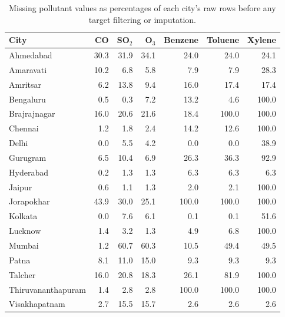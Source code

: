 \begin{table}[!htbp]
\centering
\caption{Missing pollutant values as percentages of each city's raw rows before any target filtering or imputation.}\label{tab:missing1}
\setlength{\tabcolsep}{4pt}
\begin{tabular}{lrrrrrr}
\toprule
City & CO & SO$_2$ & O$_3$ & Benzene & Toluene & Xylene \\
\midrule
Ahmedabad & 30.3 & 31.9 & 34.1 & 24.0 & 24.0 & 24.1 \\
Amaravati & 10.2 & 6.8 & 5.8 & 7.9 & 7.9 & 28.3 \\
Amritsar & 6.2 & 13.8 & 9.4 & 16.0 & 17.4 & 17.4 \\
Bengaluru & 0.5 & 0.3 & 7.2 & 13.2 & 4.6 & 100.0 \\
Brajrajnagar & 16.0 & 20.6 & 21.6 & 18.4 & 100.0 & 100.0 \\
Chennai & 1.2 & 1.8 & 2.4 & 14.2 & 12.6 & 100.0 \\
Delhi & 0.0 & 5.5 & 4.2 & 0.0 & 0.0 & 38.9 \\
Gurugram & 6.5 & 10.4 & 6.9 & 26.3 & 36.3 & 92.9 \\
Hyderabad & 0.2 & 1.3 & 1.3 & 6.3 & 6.3 & 6.3 \\
Jaipur & 0.6 & 1.1 & 1.3 & 2.0 & 2.1 & 100.0 \\
Jorapokhar & 43.9 & 30.0 & 25.1 & 100.0 & 100.0 & 100.0 \\
Kolkata & 0.0 & 7.6 & 6.1 & 0.1 & 0.1 & 51.6 \\
Lucknow & 1.4 & 3.2 & 1.3 & 4.9 & 6.8 & 100.0 \\
Mumbai & 1.2 & 60.7 & 60.3 & 10.5 & 49.4 & 49.5 \\
Patna & 8.1 & 11.0 & 15.0 & 9.3 & 9.3 & 9.3 \\
Talcher & 16.0 & 20.8 & 18.3 & 26.1 & 81.9 & 100.0 \\
Thiruvananthapuram & 1.4 & 2.8 & 2.8 & 100.0 & 100.0 & 100.0 \\
Visakhapatnam & 2.7 & 15.5 & 15.7 & 2.6 & 2.6 & 2.6 \\
\bottomrule
\end{tabular}
\end{table}
